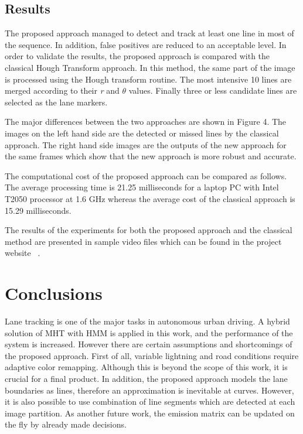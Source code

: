 \documentclass[a4paper,oneside,10pt]{article}
\begin{document}
\subsection{Results}

The proposed approach managed to detect and track at least one line in most of the sequence. In addition, false positives are reduced to an acceptable level. In order to validate the results, the proposed approach is compared with the classical Hough Transform approach. In this method, the same part of the image is processed using the Hough transform routine. The most intensive 10 lines are merged according to their \textit{r }and \textit{$\theta $} values. Finally three or less candidate lines are selected as the lane markers. 

The major differences between the two approaches are shown in Figure 4. The images on the left hand side are the detected or missed lines by the classical approach. The right hand side images are the outputs of the new approach for the same frames which show that the new approach is more robust and accurate.

The computational cost of the proposed approach can be compared as follows. The average processing time is 21.25 milliseconds for a laptop PC with Intel T2050 processor at 1.6 GHz whereas the average cost of the classical approach is 15.29 milliseconds. 

The results of the experiments for both the proposed approach and the classical method are presented in sample video files which can be found in the project website ~\cite{ades09}.

\section{Conclusions}

Lane tracking is one of the major tasks in autonomous urban driving. A hybrid solution of MHT with HMM is applied in this work, and the performance of the system is increased. However there are certain assumptions and shortcomings of the proposed approach. First of all, variable lightning and road conditions require adaptive color remapping. Although this is beyond the scope of this work, it is crucial for a final product. In addition, the proposed approach models the lane boundaries as lines, therefore an approximation is inevitable at curves. However, it is also possible to use combination of line segments which are detected at each image partition. As another future work, the emission matrix can be updated on the fly by already made decisions.
\end{document}
